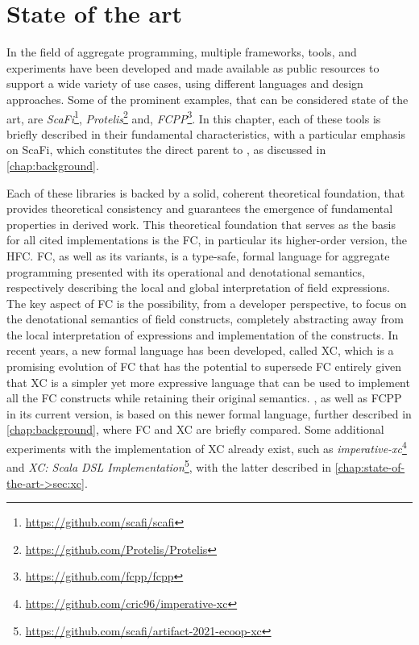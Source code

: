 \chapter{State of the art}
\label{chap:state-of-the-art}

In the field of aggregate programming\cite{aggregate-programming}, multiple frameworks, tools, and experiments have been developed and made available as public resources to support a wide variety of use cases, using different languages and design approaches.
%
Some of the prominent examples, that can be considered state of the art, are \textit{ScaFi}\footnote{\url{https://github.com/scafi/scafi}}\cite{scafi}, \textit{Protelis}\footnote{\url{https://github.com/Protelis/Protelis}}\cite{protelis} and, \textit{FCPP}\footnote{\url{https://github.com/fcpp/fcpp}}\cite{fcpp}.
%
In this chapter, each of these tools is briefly described in their fundamental characteristics, with a particular emphasis on ScaFi, which constitutes the direct parent to \this, as discussed in \cref{chap:background}.

Each of these libraries is backed by a solid, coherent theoretical foundation, that provides theoretical consistency and guarantees the emergence of fundamental properties in derived work.
%
This theoretical foundation that serves as the basis for all cited implementations is the \ac{FC}\cite{fc}, in particular its higher-order version, the \ac{HFC}\cite{hofc}.
%
\ac{FC}, as well as its variants, is a type-safe, formal language for aggregate programming\cite{fc, from-dc-to-fc-and-ap} presented with its operational and denotational semantics, respectively describing the local and global interpretation of field expressions\cite{from-dc-to-fc-and-ap}.
%
The key aspect of \ac{FC} is the possibility, from a developer perspective, to focus on the denotational semantics of field constructs, completely abstracting away from the local interpretation of expressions and implementation of the constructs.
%
In recent years, a new formal language has been developed, called \ac{XC}\cite{xc}, which is a promising evolution of \ac{FC} that has the potential to supersede \ac{FC} entirely given that \ac{XC} is a simpler yet more expressive language that can be used to implement all the \ac{FC} constructs while retaining their original semantics.
%
\this, as well as FCPP in its current version, is based on this newer formal language, further described in \cref{chap:background}, where \ac{FC} and \ac{XC} are briefly compared.
%
Some additional experiments with the implementation of \ac{XC} already exist, such as \textit{imperative-xc}\footnote{\url{https://github.com/cric96/imperative-xc}} and \textit{XC: Scala DSL Implementation}\footnote{\url{https://github.com/scafi/artifact-2021-ecoop-xc}}\cite{xc-experiment-with-scafi}, with the latter described in \cref{chap:state-of-the-art->sec:xc}.

